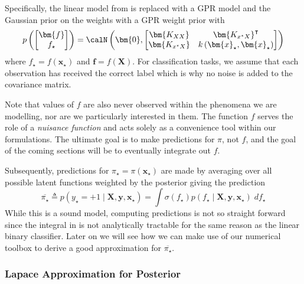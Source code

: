 Specifically, the linear model from  is replaced with a GPR model and the Gaussian prior on the weights with a GPR weight prior with
\begin{equation*}
    p \left(
    \begin{bmatrix}
            \bm{f} \\
            f_{\star}
        \end{bmatrix}
    \right)
    =
    \calN \left( \bm{0} ,
    \begin{bmatrix}
        \bm{K_{XX}}         & \bm{K_{x^{\star}X}}^{\intercal}                 \\
        \bm{K_{x^{\star}X}} & k \left( \bm{x}_{\star}, \bm{x}_{\star} \right)
    \end{bmatrix}
    \right)
\end{equation*}
where $f_{\star} = f ( \bm{x}_{\star} )$ and $\bm{f} = f \left( \bm{X} \right)$. For classification tasks, we assume that each observation has received the correct label which is why no noise is added to the covariance matrix.

Note that values of $f$ are also never observed within the phenomena we are modelling, nor are we particularly interested in them. The function $f$ serves the role of a {\it nuisance function} and acts solely as a convenience tool within our formulations. The ultimate goal is to make predictions for $\pi$, not $f$, and the goal of the coming sections will be to eventually integrate out $f$.

Subsequently, predictions for $\pi_{\star} = \pi \left( \bm{x}_{\star} \right)$ are made by averaging over all possible latent functions weighted by the posterior giving the prediction
\begin{equation} \label{eq: GP-pred-1}
    \overline{\pi_{\star}} \triangleq p \left( y_{\star} = +1 \mid \bm{X} , \bm{y} , \bm{x}_{\star} \right) = \int \sigma \left( f_{\star} \right) p \left( f_{\star} \mid \bm{X} , \bm{y} , \bm{x}_{\star} \right) \; d f_{\star}
\end{equation}
While this is a sound model, computing predictions is not so straight forward since the integral in   is not analytically tractable for the same reason as the linear binary classifier. Later on we will see how we can make use of our numerical toolbox to derive a good approximation for $\overline{\pi_{\star}}$.

\subsubsection{Lapace Approximation for Posterior}\label{Section1.6.2}

